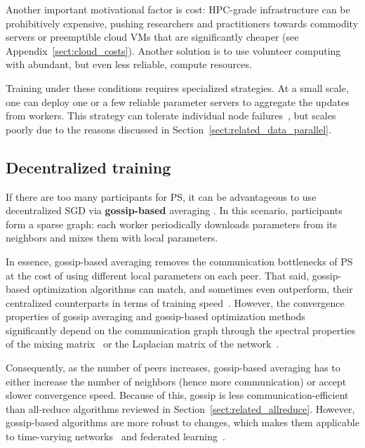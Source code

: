 Another important motivational factor is cost: HPC-grade infrastructure can be prohibitively expensive, pushing researchers and practitioners towards commodity servers or preemptible cloud VMs that are significantly cheaper (see Appendix~\ref{sect:cloud_costs}). Another solution is to use volunteer computing~\cite{volunteer_dl_async, learning_at_home} with abundant, but even less reliable, compute resources.

Training under these conditions requires specialized strategies. At a small scale, one can deploy one or a few reliable parameter servers to aggregate the updates from workers. This strategy can tolerate individual node failures~\cite{proteus}, but scales poorly due to the reasons discussed in Section~\ref{sect:related_data_parallel}.

\subsection{Decentralized training}\label{sect:related_decentralized_training}
If there are too many participants for PS, it can be advantageous to use decentralized SGD via \textbf{gossip-based} averaging \cite{boyd2006randomized,tsitsiklis1984problems,lian2017can}. In this scenario, participants form a sparse graph: each worker periodically downloads parameters from its neighbors and mixes them with local parameters.

In essence, gossip-based averaging removes the communication bottlenecks of PS at the cost of using different local parameters on each peer. That said, gossip-based optimization algorithms can match, and sometimes even outperform, their centralized counterparts in terms of training speed~\cite{scaman2017optimal,scaman2018optimal,scaman2019optimal,lian2017can,assran2019stochastic}. However, the convergence properties of gossip averaging and gossip-based optimization methods significantly depend on the communication graph through the spectral properties of the mixing matrix~\cite{xiao2004fast,scaman2019optimal} or the Laplacian matrix of the network~\cite{merris1994laplacian,uribe2020dual}. 

Consequently, as the number of peers increases, gossip-based averaging has to either increase the number of neighbors (hence more communication) or accept slower convergence speed. Because of this, gossip is less communication-efficient than all-reduce algorithms reviewed in Section~\ref{sect:related_allreduce}. However, gossip-based algorithms are more robust to changes, which makes them applicable to time-varying networks~\cite{nedic2014distributed,nedic2016stochastic,nedic2018network,rogozin2019projected} and federated learning~\cite{ram2009asynchronous,yan2012distributed,yuan2016convergence}.

